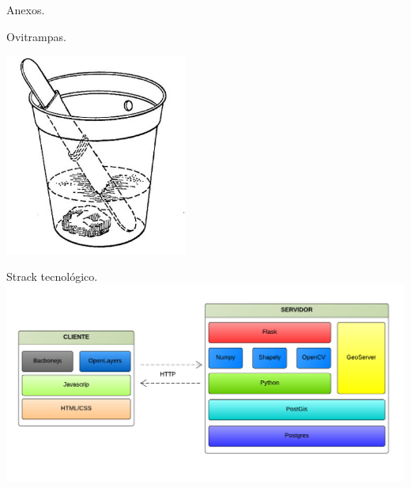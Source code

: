 \begin{frame}[c,plain]{}
    \begin{center}
    Anexos.
    \end{center}
\end{frame}



\begin{frame}[c]{Ovitrampas.}
  \begin{center}
    \includegraphics[width=6cm]{../book/capitulo-3/graphics/ovitrampa.jpg}
  \end{center}
\end{frame}

\begin{frame}[c]{Strack tecnológico.}
\includegraphics[width=\textwidth]{../book/capitulo-5/graphics/stack-tecnologias.png}
\end{frame}


